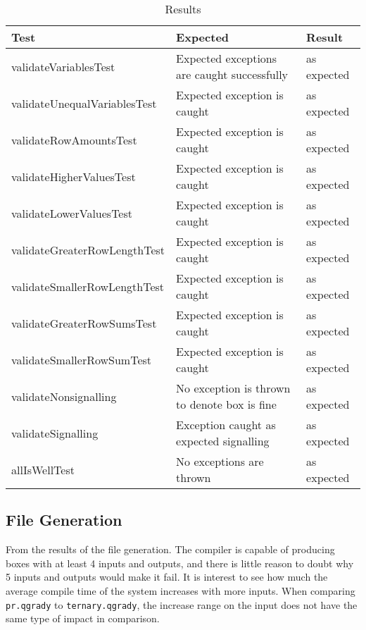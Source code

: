 \documentclass[report.tex]{subfiles}
\begin{document}
\begin{table}[H]
    \centering
    \begin{tabular}{l | p{6cm} | l}
    Test & Expected & Result \\    
    \hline
    validateVariablesTest & Expected exceptions are caught successfully 
    & as expected \\
    validateUnequalVariablesTest & Expected exception is caught 
    & as expected \\
    validateRowAmountsTest & Expected exception is caught & as expected \\
    validateHigherValuesTest & Expected exception is caught & as expected \\
    validateLowerValuesTest & Expected exception is caught & as expected \\
    validateGreaterRowLengthTest & Expected exception is caught & as expected \\
    validateSmallerRowLengthTest & Expected exception is caught & as expected \\
    validateGreaterRowSumsTest & Expected exception is caught & as expected \\
    validateSmallerRowSumTest & Expected exception is caught & as expected \\
    validateNonsignalling & No exception is thrown to denote box is fine & as expected \\
    validateSignalling & Exception caught as expected signalling & as expected \\
    allIsWellTest & No exceptions are thrown & as expected \\
    \end{tabular}
    \caption{Results}
  \label{tab:semantics_result}
\end{table}

\subsection{File Generation} %
\label{sub:file_generation}
From the results of the file generation. The compiler is capable of producing
boxes with at least 4 inputs and outputs, and there is little reason to doubt
why 5 inputs and outputs would make it fail. It is interest to see how much the
average compile time of the system increases with more inputs. When comparing
\texttt{pr.qgrady} to \texttt{ternary.qgrady}, the increase range on the input
does not have the same type of impact in comparison.
\end{document}
